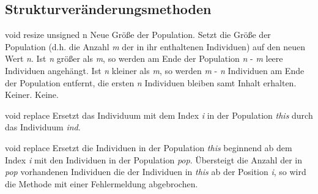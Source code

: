 \documentclass{report}
\begin{document}
\vspace{4ex}

\subsection{Strukturver\"anderungsmethoden}

\setNormalInstance
\printMethodWithOneParam
{void}
{resize}
{unsigned}
{n}
{Neue Gr\"o{\ss}e der Population.}
{Setzt die Gr\"o{\ss}e der Population (d.h. die Anzahl {\em m} der in ihr 
 enthaltenen Individuen) auf den neuen Wert {\em n}. Ist {\em n} gr\"o{\ss}er
 als {\em m}, so werden am Ende der Population {\em n} - {\em m} leere
 Individuen angeh\"angt. Ist {\em n} kleiner als {\em m}, so werden
 {\em m} - {\em n} Individuen am Ende der Population entfernt, die ersten
 {\em n} Individuen bleiben samt Inhalt erhalten.}
{Keiner.}
{Keine.}

\newpage


\setNormalInstance
\setCorrectWidthThree{8pt}
\printMethodWithParamsSaved
{void}
{}
{replace}
{Ersetzt das Individuum mit dem Index {\em i} in der Population {\em this} 
 durch das Individuum {\em ind}.}
{}
\setCorrectWidthThree{4pt}

\vspace{4ex}

\setNormalInstance
\setCorrectWidthThree{8pt}
\printMethodWithParamsSaved
{void}
{}
{replace}
{Ersetzt die Individuen in der Population {\em this} beginnend ab dem Index 
 {\em i} mit den Individuen in der Population {\em pop}.
 \"Ubersteigt die Anzahl der in {\em pop} vorhandenen Individuen die
                          der Individuen in {\em this} ab der 
                          Position {\em i}, so wird die
                          Methode mit einer Fehlermeldung
                          abgebrochen.}
{}
\setCorrectWidthThree{4pt}
\end{document}
